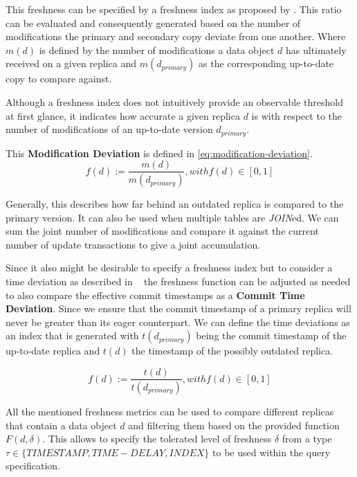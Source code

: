 \begin{description}
        This freshness can be specified by a freshness index as proposed by \cite{rohm:2002}.
        This ratio can be evaluated and consequently generated based on the number of modifications the primary and 
        secondary copy deviate from one another. Where $m(d)$ is defined by the number of modifications a data object $d$ has ultimately received on a given replica
        and $m(d_{primary})$ as the corresponding up-to-date copy to compare against. 

        Although a freshness index does not intuitively provide an observable threshold at first glance, it indicates how accurate a 
        given replica $d$ is with respect to the number of modifications of an up-to-date version $d_{primary}$.

        This \textbf{Modification Deviation} is defined in \ref{eq:modification-deviation}.
        \begin{equation} \label{eq:modification-deviation}
            f(d) := \frac{m(d)}{m(d_{primary})},  with f(d) \in [0,1]
        \end{equation}
        
        Generally, this describes how far behind an outdated replica is compared to the primary version.
        It can also be used when multiple tables are \emph{JOIN}ed.
        We can sum the joint number of modifications and compare it against the current number of update transactions to give a joint accumulation.

        Since it also might be desirable to specify a freshness index but to consider a time deviation as described in ~\cite{voicu:2010,hennemann_sw_2021}
        the freshness function can be adjusted as needed to also compare the effective commit timestamps as a \textbf{Commit Time Deviation}.
        Since we ensure that the commit timestamp of a primary replica will never be greater than its eager counterpart. We can define the time deviations as an index that is 
        generated with $t(d_{primary})$ being the commit timestamp of the up-to-date replica and $t(d)$ the timestamp of the possibly outdated replica.


        \begin{equation}
            f(d) := \frac{t(d)}{t(d_{primary})},  with f(d) \in [0,1]
        \end{equation}

\end{description}

All the mentioned freshness metrics can be used to compare different replicas that contain a data object $d$ and filtering them based on the provided function $F(d, \delta)$.
This allows to specify the tolerated level of freshness $\delta$ from a type $\tau \in \{TIMESTAMP, TIME-DELAY, INDEX\}$ to be used within the query specification.

